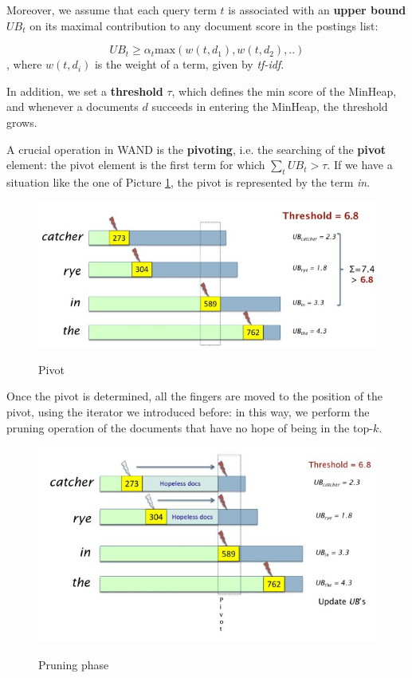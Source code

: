 Moreover, we assume that each query term $t$ is associated with an \textbf{upper bound} $UB_t$ on its maximal contribution to any document score in the postings list:

$$
UB_t \geq \alpha_t \text{max}(w(t,d_1), w(t,d_2), ..)
$$
, where $w(t,d_i)$ is the weight of a term, given by \textit{tf-idf}.

In addition, we set a \textbf{threshold} $\tau$, which defines the min score of the MinHeap, and whenever a documents $d$ succeeds in entering the MinHeap, the threshold grows.

A crucial operation in WAND is the \textbf{pivoting}, i.e. the searching of the \textbf{pivot} element: the pivot element is the first term for which $\sum_t UB_t > \tau$. If we have a situation like the one of Picture \ref{pivot}, the pivot is represented by the term \textit{in}.

\begin{figure}[h!]
		\centering
		\includegraphics[scale = 1.5]{img/pivot example.jpg}
		\label{pivot}
        \caption{Pivot}
\end{figure}

Once the pivot is determined, all the fingers are moved to the position of the pivot, using the iterator we introduced before: in this way, we perform the pruning operation of the documents that have no hope of being in the top-$k$.

\begin{figure}[h!]
		\centering
		\includegraphics[scale = 1.5]{img/wand pruning.jpg}
		\label{pruning}
        \caption{Pruning phase}
\end{figure}

